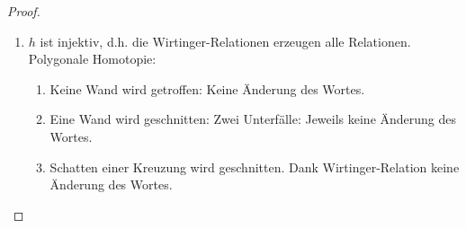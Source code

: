 \begin{st}[Wirtinger, <1900]
\begin{proof}
\begin{enumerate}[1),start=0]
                Wir nutzen die polygonale Fundamentalgruppe (mittels polygonaler Approximation)
                \begin{math}
                    \pi_1(\R^3 \setminus K, *)
                    = \frac{\Set{\text{Schleifen}}}{\text{Homotopie}}
                    = \frac{\Set{\text{polygonale Schleifen}}}{\text{polygonale Homotopie}}.
                \end{math}
                Ohne Einschränkung betrachten wir also polygonale Schleifen $\gamma$ in $\R^3 \setminus K$.
                Zu zeigen ist $\gamma \homotopic \gamma_{i_1}^{e_1} \dotsb \gamma_{i_l}^{e_l}$.
                Trick: Betrachte den „Schatten“ des Knotens $K \subset \R^3$ unter senkrecht von oben einfallendem Licht.
                Genauer: Zu $K \subset \R^3$ ist der Schatten $\hat K = \Set{(x,y,z) \in \R^3 & \exists z' \ge z: (x,y,z') \in K}$.
                Dies ist die Vereinigung über alle Schatten $\hat A$ der Kanten $A$ von $K$.
                \begin{prop}
                    Es gilt $\R^3 \setminus \hat K \homequiv *$
                    \begin{proof}
                        Übung: explizite Formel, vgl. Sternförmig bei Zentralprojektion.
                    \end{proof}
                \end{prop}
                Ablesen an $w = [\gamma]$ eines Wortes in $w_i = [\gamma_i]$.
                Wir nehmen an, dass $\gamma$ die Wände $\hat A$ transversal im Inneren trifft.
                Jeder Durchgang liefert einen Erzeuger $w_i^{\pm 1}$.
                Damit gilt $\gamma = \gamma_{i_1}^{e_1} \dotsb \gamma_{i_l}^{e_l}$.
            \item
                $h$ ist injektiv, d.h. die Wirtinger-Relationen erzeugen alle Relationen.
                Polygonale Homotopie:
                \begin{enumerate}[1)]
                    \item
                        Keine Wand wird getroffen: Keine Änderung des Wortes.
                    \item
                        Eine Wand wird geschnitten:
                        Zwei Unterfälle: Jeweils keine Änderung des Wortes.
                    \item
                        Schatten einer Kreuzung wird geschnitten.
                        Dank Wirtinger-Relation keine Änderung des Wortes.
                \end{enumerate}
        \end{enumerate}
    \end{proof}
\end{st}


